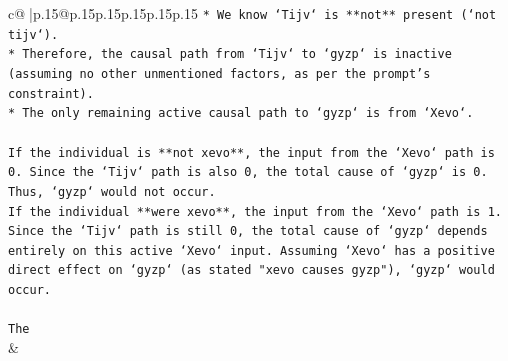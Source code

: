 \documentclass{article}
\begin{document}
{\begin{supertabular}{c@{$\;$}|p{.15\linewidth}@{}p{.15\linewidth}p{.15\linewidth}p{.15\linewidth}p{.15\linewidth}p{.15\linewidth}}
{{{\texttt{*   We know `Tijv` is **not** present (`not tijv`).} \\
\texttt{*   Therefore, the causal path from `Tijv` to `gyzp` is inactive (assuming no other unmentioned factors, as per the prompt's constraint).} \\
\texttt{*   The only remaining active causal path to `gyzp` is from `Xevo`.} \\
\\ 
\texttt{If the individual is **not xevo**, the input from the `Xevo` path is 0. Since the `Tijv` path is also 0, the total cause of `gyzp` is 0. Thus, `gyzp` would not occur.} \\
\texttt{If the individual **were xevo**, the input from the `Xevo` path is 1. Since the `Tijv` path is still 0, the total cause of `gyzp` depends entirely on this active `Xevo` input. Assuming `Xevo` has a positive direct effect on `gyzp` (as stated "xevo causes gyzp"), `gyzp` would occur.} \\
\\ 
\texttt{The} \\
            }
        }
    }
    & \\ \\


\end{supertabular}}
\end{document}
